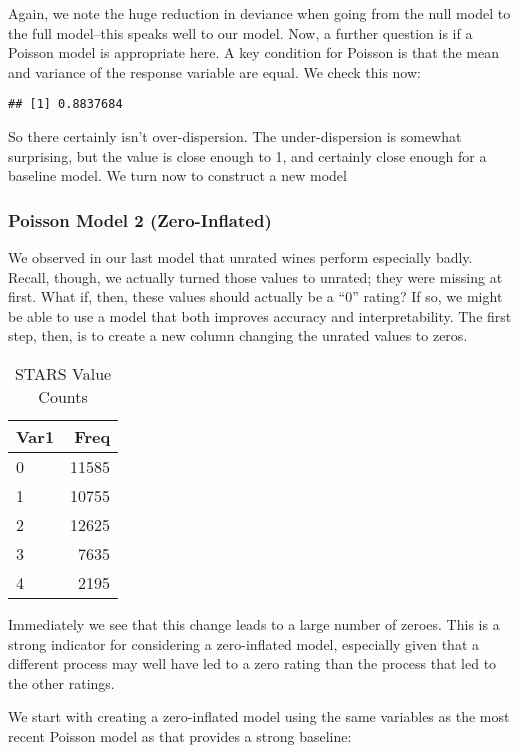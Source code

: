 \documentclass[
]{article}
\begin{document}
Again, we note the huge reduction in deviance when going from the null
model to the full model--this speaks well to our model. Now, a further
question is if a Poisson model is appropriate here. A key condition for
Poisson is that the mean and variance of the response variable are
equal. We check this now:

\begin{verbatim}
## [1] 0.8837684
\end{verbatim}

So there certainly isn't over-dispersion. The under-dispersion is
somewhat surprising, but the value is close enough to 1, and certainly
close enough for a baseline model. We turn now to construct a new model

\subsubsection{Poisson Model 2
(Zero-Inflated)}\label{poisson-model-2-zero-inflated}

We observed in our last model that unrated wines perform especially
badly. Recall, though, we actually turned those values to unrated; they
were missing at first. What if, then, these values should actually be a
``0'' rating? If so, we might be able to use a model that both improves
accuracy and interpretability. The first step, then, is to create a new
column changing the unrated values to zeros.

\begin{table}[H]
\centering\centering
\caption{\label{tab:unnamed-chunk-21}STARS Value Counts}
\centering
\begin{tabular}[t]{l|r}
\hline
Var1 & Freq\\
\hline
0 & 11585\\
\hline
1 & 10755\\
\hline
2 & 12625\\
\hline
3 & 7635\\
\hline
4 & 2195\\
\hline
\end{tabular}
\end{table}

Immediately we see that this change leads to a large number of zeroes.
This is a strong indicator for considering a zero-inflated model,
especially given that a different process may well have led to a zero
rating than the process that led to the other ratings.

We start with creating a zero-inflated model using the same variables as
the most recent Poisson model as that provides a strong baseline:
\end{document}
